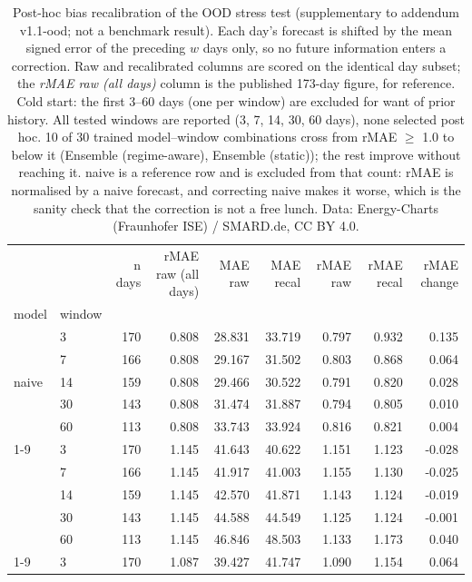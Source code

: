 \begin{table}[htbp]
\caption{Post-hoc bias recalibration of the OOD stress test (supplementary to addendum v1.1-ood; not a benchmark result). Each day's forecast is shifted by the mean signed error of the preceding $w$ days only, so no future information enters a correction. Raw and recalibrated columns are scored on the identical day subset; the \emph{rMAE raw (all days)} column is the published 173-day figure, for reference. Cold start: the first 3--60 days (one per window) are excluded for want of prior history. All tested windows are reported (3, 7, 14, 30, 60 days), none selected post hoc. 10 of 30 trained model--window combinations cross from rMAE $\geq$ 1.0 to below it (Ensemble (regime-aware), Ensemble (static)); the rest improve without reaching it. naive is a reference row and is excluded from that count: rMAE is normalised by a naive forecast, and correcting naive makes it worse, which is the sanity check that the correction is not a free lunch. Data: Energy-Charts (Fraunhofer ISE) / SMARD.de, CC BY 4.0.}
\label{tab:ood-recalibration}
\begin{tabular}{llrrrrrrr}
\toprule
 &  & n days & rMAE raw (all days) & MAE raw & MAE recal & rMAE raw & rMAE recal & rMAE change \\
model & window &  &  &  &  &  &  &  \\
\midrule
\multirow[t]{5}{*}{naive} & 3 & 170 & 0.808 & 28.831 & 33.719 & 0.797 & 0.932 & 0.135 \\
 & 7 & 166 & 0.808 & 29.167 & 31.502 & 0.803 & 0.868 & 0.064 \\
 & 14 & 159 & 0.808 & 29.466 & 30.522 & 0.791 & 0.820 & 0.028 \\
 & 30 & 143 & 0.808 & 31.474 & 31.887 & 0.794 & 0.805 & 0.010 \\
 & 60 & 113 & 0.808 & 33.743 & 33.924 & 0.816 & 0.821 & 0.004 \\
\cline{1-9}
\multirow[t]{5}{*}{SARIMAX} & 3 & 170 & 1.145 & 41.643 & 40.622 & 1.151 & 1.123 & -0.028 \\
 & 7 & 166 & 1.145 & 41.917 & 41.003 & 1.155 & 1.130 & -0.025 \\
 & 14 & 159 & 1.145 & 42.570 & 41.871 & 1.143 & 1.124 & -0.019 \\
 & 30 & 143 & 1.145 & 44.588 & 44.549 & 1.125 & 1.124 & -0.001 \\
 & 60 & 113 & 1.145 & 46.846 & 48.503 & 1.133 & 1.173 & 0.040 \\
\cline{1-9}
\multirow[t]{5}{*}{LEAR-LASSO} & 3 & 170 & 1.087 & 39.427 & 41.747 & 1.090 & 1.154 & 0.064 \\

\end{tabular}
\end{table}
